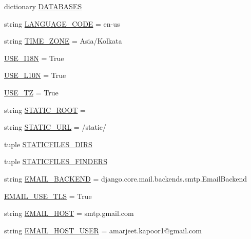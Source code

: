 \begin{DoxyCompactItemize}
\item 
dictionary \hyperlink{namespacesage_1_1settings_a870c10acdd1141ac92340ce3e50ffbbd}{D\+A\+T\+A\+B\+A\+S\+E\+S}
\item 
string \hyperlink{namespacesage_1_1settings_ac5b7a49ef37a25508ecb84453063821a}{L\+A\+N\+G\+U\+A\+G\+E\+\_\+\+C\+O\+D\+E} = \textquotesingle{}en-\/us\textquotesingle{}
\item 
string \hyperlink{namespacesage_1_1settings_a07421ef620becc4c93753901abdf83c0}{T\+I\+M\+E\+\_\+\+Z\+O\+N\+E} = \textquotesingle{}Asia/Kolkata\textquotesingle{}
\item 
\hyperlink{namespacesage_1_1settings_acf5dd02a352695a98f57bef7679a29af}{U\+S\+E\+\_\+\+I18\+N} = True
\item 
\hyperlink{namespacesage_1_1settings_a9d0e7298d4688c99e0ee9e965d950de0}{U\+S\+E\+\_\+\+L10\+N} = True
\item 
\hyperlink{namespacesage_1_1settings_aa385f778cd7bd79cc4c688fec7c101a2}{U\+S\+E\+\_\+\+T\+Z} = True
\item 
string \hyperlink{namespacesage_1_1settings_a91b967847aecdd4d0edfbb0229656929}{S\+T\+A\+T\+I\+C\+\_\+\+R\+O\+O\+T} = \textquotesingle{}\textquotesingle{}
\item 
string \hyperlink{namespacesage_1_1settings_a0b4647cdde23eaed09c255182a9f576c}{S\+T\+A\+T\+I\+C\+\_\+\+U\+R\+L} = \textquotesingle{}/static/\textquotesingle{}
\item 
tuple \hyperlink{namespacesage_1_1settings_ac4ae870dea0d58410747ddcbdff2b3d7}{S\+T\+A\+T\+I\+C\+F\+I\+L\+E\+S\+\_\+\+D\+I\+R\+S}
\item 
tuple \hyperlink{namespacesage_1_1settings_af629022b1da961fa9828f450bc80bd22}{S\+T\+A\+T\+I\+C\+F\+I\+L\+E\+S\+\_\+\+F\+I\+N\+D\+E\+R\+S}
\item 
string \hyperlink{namespacesage_1_1settings_a2d83ca0a279480aa03599465a0386b17}{E\+M\+A\+I\+L\+\_\+\+B\+A\+C\+K\+E\+N\+D} = \textquotesingle{}django.\+core.\+mail.\+backends.\+smtp.\+Email\+Backend\textquotesingle{}
\item 
\hyperlink{namespacesage_1_1settings_a0fe7c4174cb1b7d03f7b574ae1e5eed9}{E\+M\+A\+I\+L\+\_\+\+U\+S\+E\+\_\+\+T\+L\+S} = True
\item 
string \hyperlink{namespacesage_1_1settings_a594329fe15c9680f523afaab779411ed}{E\+M\+A\+I\+L\+\_\+\+H\+O\+S\+T} = \textquotesingle{}smtp.\+gmail.\+com\textquotesingle{}
\item 
string \hyperlink{namespacesage_1_1settings_a9c01855359753a3c3f517341806347c2}{E\+M\+A\+I\+L\+\_\+\+H\+O\+S\+T\+\_\+\+U\+S\+E\+R} = \textquotesingle{}amarjeet.\+kapoor1@gmail.\+com\textquotesingle{}

\end{DoxyCompactItemize}
